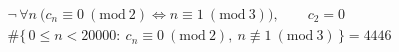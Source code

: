 \documentclass{article}
\begin{document}
\[
\begin{aligned}
&\neg\,\forall n\ \bigl(c_n\equiv0\ (\mathrm{mod}\ 2)\iff n\equiv1\ (\mathrm{mod}\ 3)\bigr),\qquad c_2=0\\
&\#\{\,0\le n<20000:\ c_n\equiv0\ (\mathrm{mod}\ 2),\ n\not\equiv1\ (\mathrm{mod}\ 3)\,\}=4446
\end{aligned}
\]
\end{document}
